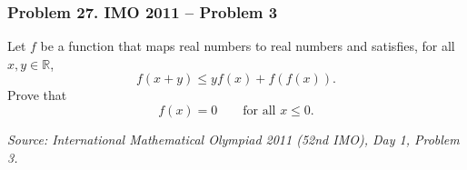 \subsubsection*{Problem 27. IMO 2011 -- Problem 3}

\begin{exercisebox}[hard]

Let $f$ be a function that maps real numbers to real numbers and
satisfies, for all $x,y\in\mathbb R$,
\[
f(x+y)\leq yf(x)+f(f(x)).
\]
Prove that
\[
f(x)=0\qquad\text{for all }x\leq0.
\]

\medskip
\noindent
\textit{Source: International Mathematical Olympiad 2011 (52nd IMO),
Day 1, Problem 3.}


\end{exercisebox}